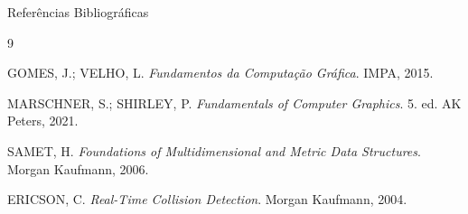 \documentclass[10pt, aspectratio=169]{beamer}
\begin{document}
\begin{frame}{Referências Bibliográficas}
    \begin{thebibliography}{9}
        \footnotesize
        
        GOMES, J.; VELHO, L. \textit{Fundamentos da Computação Gráfica}. IMPA, 2015.
        
        MARSCHNER, S.; SHIRLEY, P. \textit{Fundamentals of Computer Graphics}. 5. ed. AK Peters, 2021.
        
        SAMET, H. \textit{Foundations of Multidimensional and Metric Data Structures}. Morgan Kaufmann, 2006.
        
        ERICSON, C. \textit{Real-Time Collision Detection}. Morgan Kaufmann, 2004.
        
    \end{thebibliography}
\end{frame}
\end{document}
